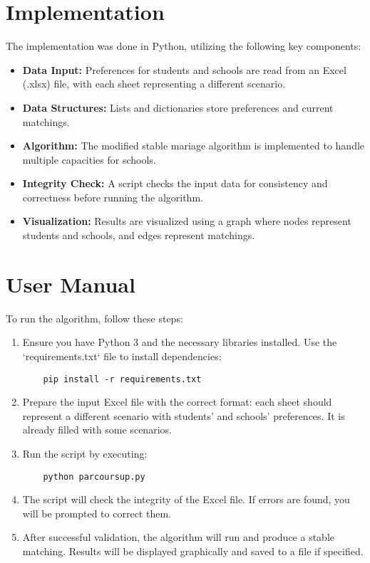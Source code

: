 \documentclass{article}
\begin{document}
\section{Implementation}
The implementation was done in Python, utilizing the following key components:

\begin{itemize}
    \item \textbf{Data Input:} Preferences for students and schools are read from an Excel (.xlsx) file, with each sheet representing a different scenario.
    \item \textbf{Data Structures:} Lists and dictionaries store preferences and current matchings.
    \item \textbf{Algorithm:} The modified stable mariage algorithm is implemented to handle multiple capacities for schools.
    \item \textbf{Integrity Check:} A script checks the input data for consistency and correctness before running the algorithm.
    \item \textbf{Visualization:} Results are visualized using a graph where nodes represent students and schools, and edges represent matchings.
\end{itemize}

\section{User Manual}
To run the algorithm, follow these steps:

\begin{enumerate}
    \item Ensure you have Python 3 and the necessary libraries installed. Use the `requirements.txt` file to install dependencies:
          \begin{verbatim}
    pip install -r requirements.txt
    \end{verbatim}
    \item Prepare the input Excel file with the correct format: each sheet should represent a different scenario with students' and schools' preferences. It is already filled with some scenarios.
    \item Run the script by executing:
          \begin{verbatim}
    python parcoursup.py
    \end{verbatim}
    \item The script will check the integrity of the Excel file. If errors are found, you will be prompted to correct them.
    \item After successful validation, the algorithm will run and produce a stable matching. Results will be displayed graphically and saved to a file if specified.
\end{enumerate}
\end{document}
